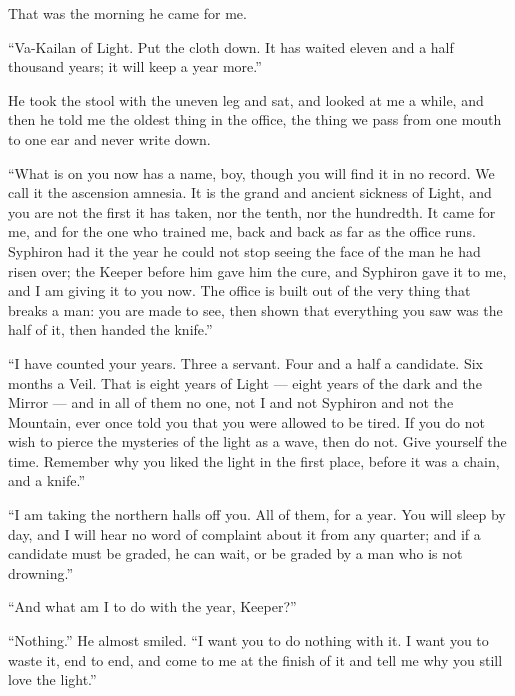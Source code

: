 That was the morning he came for me.\par

``Va-Kailan of Light. Put the cloth down. It has waited eleven and a half thousand years; it will keep a year more.''\par

He took the stool with the uneven leg and sat, and looked at me a while, and then he told me the oldest thing in the office, the thing we pass from one mouth to one ear and never write down.\par

``What is on you now has a name, boy, though you will find it in no record. We call it the ascension amnesia. It is the grand and ancient sickness of Light, and you are not the first it has taken, nor the tenth, nor the hundredth. It came for me, and for the one who trained me, back and back as far as the office runs. Syphiron had it the year he could not stop seeing the face of the man he had risen over; the Keeper before him gave him the cure, and Syphiron gave it to me, and I am giving it to you now. The office is built out of the very thing that breaks a man: you are made to see, then shown that everything you saw was the half of it, then handed the knife.''\par

``I have counted your years. Three a servant. Four and a half a candidate. Six months a Veil. That is eight years of Light --- eight years of the dark and the Mirror --- and in all of them no one, not I and not Syphiron and not the Mountain, ever once told you that you were allowed to be tired. If you do not wish to pierce the mysteries of the light as a wave, then do not. Give yourself the time. Remember why you liked the light in the first place, before it was a chain, and a knife.''\par

``I am taking the northern halls off you. All of them, for a year. You will sleep by day, and I will hear no word of complaint about it from any quarter; and if a candidate must be graded, he can wait, or be graded by a man who is not drowning.''\par

``And what am I to do with the year, Keeper?''\par

``Nothing.'' He almost smiled. ``I want you to do nothing with it. I want you to waste it, end to end, and come to me at the finish of it and tell me why you still love the light.''\par

